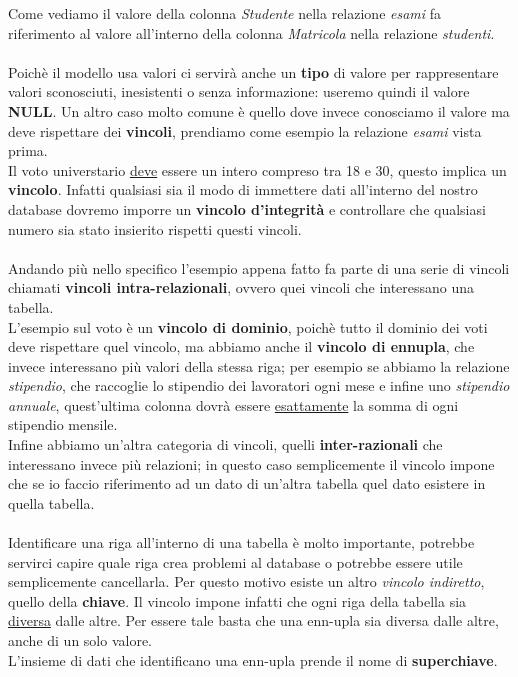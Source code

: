 Come vediamo il valore della colonna \textit{Studente} nella
relazione \textit{esami} fa riferimento al valore all'interno
della colonna \textit{Matricola} nella relazione \textit{studenti}.
\\
\\
Poichè il modello usa valori ci servirà anche un \textbf{tipo} di
valore per rappresentare valori sconosciuti, inesistenti o senza 
informazione: useremo quindi il valore \textbf{NULL}.
Un altro caso molto comune è quello dove invece conosciamo il valore
ma deve rispettare dei \textbf{vincoli}, prendiamo come esempio 
la relazione \textit{esami} vista prima. \\
Il voto universtario \underline{deve} essere un intero compreso
tra 18 e 30, questo implica un \textbf{vincolo}. Infatti 
qualsiasi sia il modo di immettere dati all'interno del 
nostro database dovremo imporre un \textbf{vincolo d'integrità} e 
controllare che qualsiasi numero sia stato insierito rispetti questi
vincoli.
\\
\\
Andando più nello specifico l'esempio appena fatto fa parte 
di una serie di vincoli chiamati \textbf{vincoli intra-relazionali},
ovvero quei vincoli che interessano una tabella. \\
L'esempio sul voto è un \textbf{vincolo di dominio}, poichè tutto
il dominio dei voti deve rispettare quel vincolo, ma abbiamo anche il 
\textbf{vincolo di ennupla}, che invece interessano più valori della
stessa riga; per esempio se abbiamo la relazione \textit{stipendio}, 
che raccoglie lo stipendio dei lavoratori ogni mese e infine uno 
\textit{stipendio annuale}, quest'ultima colonna dovrà essere 
\underline{esattamente} la somma di ogni stipendio mensile. \\
Infine abbiamo un'altra categoria di vincoli, quelli \textbf{inter-razionali}
che interessano invece più relazioni; in questo caso semplicemente
il vincolo impone che se io faccio riferimento ad un dato di un'altra 
tabella quel dato  esistere in quella tabella.
\\
\\
Identificare una riga all'interno di una tabella è molto importante,
potrebbe servirci capire quale riga crea problemi al database o 
potrebbe essere utile semplicemente cancellarla. Per questo motivo
esiste un altro \textit{vincolo indiretto}, quello della \textbf{chiave}.
Il vincolo impone infatti che ogni riga della tabella sia
\underline{diversa} dalle altre. Per essere tale basta che una 
enn-upla sia diversa dalle altre, anche di un solo valore. \\
L'insieme di dati che identificano una enn-upla prende il nome di 
\textbf{superchiave}.

